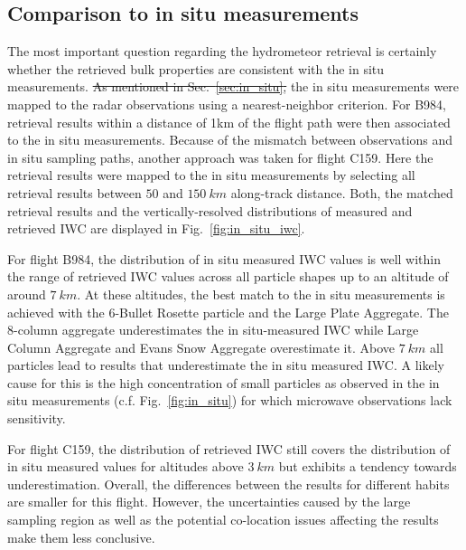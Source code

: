 \documentclass[journal abbreviation, manuscript]{copernicus}
\providecommand{\DIFadd}[1]{{\protect\color{blue}\uwave{#1}}} %
\providecommand{\DIFdel}[1]{{\protect\color{red}\sout{#1}}}                      %
\providecommand{\DIFaddbegin}{} %
\providecommand{\DIFaddend}{} %
\providecommand{\DIFdelbegin}{} %
\providecommand{\DIFdelend}{} %
\begin{document}
\subsection{Comparison to in situ measurements}

The most important question regarding the hydrometeor retrieval is certainly
whether the retrieved bulk properties are consistent with the in situ
measurements. \DIFdelbegin \DIFdel{As mentioned in Sec.~\ref{sec:in_situ}, }\DIFdelend \DIFaddbegin \DIFadd{To compare }\DIFaddend the in situ measurements \DIFaddbegin \DIFadd{to the retrieval results, they
}\DIFaddend were mapped to the radar observations using a nearest-neighbor criterion. For
B984, retrieval results within a distance of 1km of the flight path were then
associated to the in situ measurements. Because of the mismatch between
observations and in situ sampling paths, another approach was taken for flight
C159. Here the retrieval results were mapped to the in situ measurements by
selecting all retrieval results between $50$ and $150\ \unit{km}$ along-track
distance. Both, the matched retrieval results and the vertically-resolved
distributions of measured and retrieved IWC are displayed in
Fig.~\ref{fig:in_situ_iwc}.

For flight B984, the distribution of in situ measured IWC values is well within
the range of retrieved IWC values across all particle shapes up to an altitude
of around $7\ \unit{km}$. At these altitudes, the best match to the in situ
measurements is achieved with the 6-Bullet Rosette particle and the Large Plate
Aggregate. The 8-column aggregate underestimates the in situ-measured IWC while
Large Column Aggregate and Evans Snow Aggregate overestimate it. Above
$7\ \unit{km}$ all particles lead to results that underestimate the
in situ measured IWC. A likely cause for this is the high concentration of
small particles as observed in the in situ measurements (c.f.
Fig.~\ref{fig:in_situ}) for which microwave observations lack
sensitivity.

For flight C159, the distribution of retrieved IWC still covers the distribution
of in situ measured values for altitudes above $3\ \unit{km}$ but exhibits a
tendency towards underestimation. Overall, the differences between the results
for different habits are smaller for this flight. However, the uncertainties
caused by the large sampling region as well as the potential co-location issues
affecting the results make them less conclusive.
\end{document}
